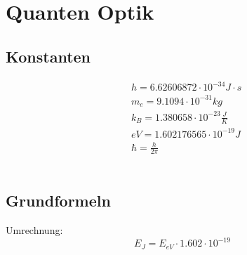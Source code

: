 



\chapter{Quanten Optik}
\section{Konstanten}
\[
\boxed{\begin{aligned}	
		&h = 6.62606872\cdot 10^{-34} J\cdot s \\
		&m_e = 9.1094\cdot 10^{-31}kg \\
		&k_B = 1.380658 \cdot 10^{-23} \frac{J}{K}\\
		&eV = 1.602176565 \cdot 10^{-19}J\\
		&\hbar = \frac{h}{2\pi}
	\end{aligned}}	\]
\\
\section{Grundformeln}
Umrechnung:
\[
	E_J = E_{eV} \cdot 1.602\cdot 10^{-19}
\]
\\
